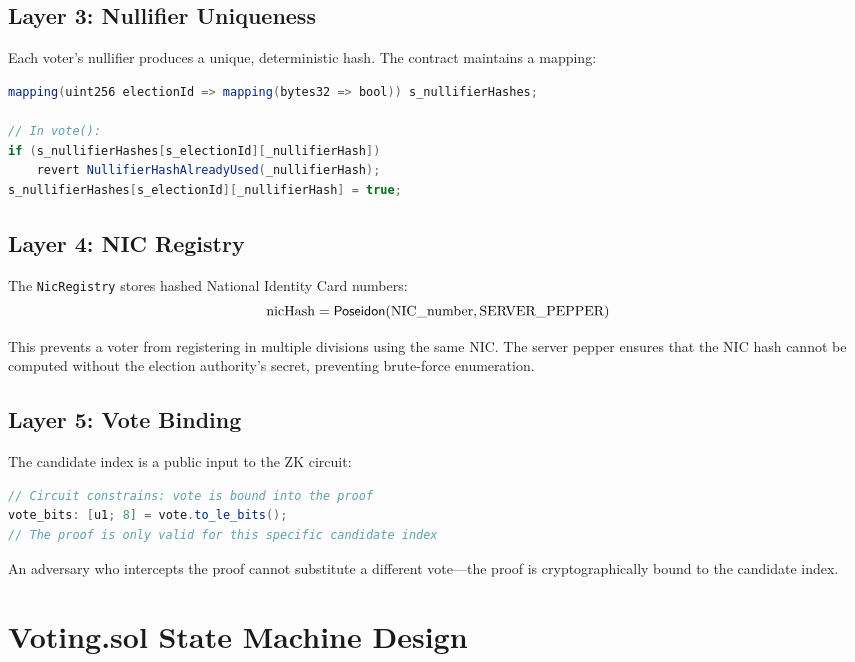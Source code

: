 \subsection{Layer 3: Nullifier Uniqueness}

Each voter's nullifier produces a unique, deterministic hash. The contract maintains a mapping:
\begin{lstlisting}[language=Java, caption={Nullifier uniqueness enforcement.}]
mapping(uint256 electionId => mapping(bytes32 => bool)) s_nullifierHashes;

// In vote():
if (s_nullifierHashes[s_electionId][_nullifierHash])
    revert NullifierHashAlreadyUsed(_nullifierHash);
s_nullifierHashes[s_electionId][_nullifierHash] = true;
\end{lstlisting}

\subsection{Layer 4: NIC Registry}

The \texttt{NicRegistry} stores hashed National Identity Card numbers:
\begin{equation}
\text{nicHash} = \mathsf{Poseidon}(\text{NIC\_number}, \text{SERVER\_PEPPER})
\end{equation}

This prevents a voter from registering in multiple divisions using the same NIC. The server pepper ensures that the NIC hash cannot be computed without the election authority's secret, preventing brute-force enumeration.

\subsection{Layer 5: Vote Binding}

The candidate index is a public input to the ZK circuit:
\begin{lstlisting}[language=Java, caption={Vote binding in the Noir circuit.}]
// Circuit constrains: vote is bound into the proof
vote_bits: [u1; 8] = vote.to_le_bits();
// The proof is only valid for this specific candidate index
\end{lstlisting}

An adversary who intercepts the proof cannot substitute a different vote---the proof is cryptographically bound to the candidate index.

\section{Voting.sol State Machine Design}

